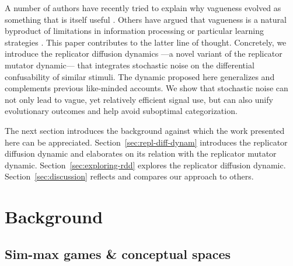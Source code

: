 \documentclass[fleqn,reqno,10pt]{article}
\begin{document}
A number of authors have recently tried to explain why vagueness
evolved as something that is itself useful
\citep[e.g.][]{Jaegherde-Jaegher2003:A-Game-Theoreti,Deemter2009:Utility-and-Lan,BlumeBoard2013:Intentional-Vag}.
Others have argued that vagueness is a natural byproduct of
limitations in information processing or particular learning
strategies
\citep[e.g.][]{FrankeJager2010:Vagueness-Signa,OConnor2013:The-Evolution-o}. This
paper contributes to the latter line of thought. Concretely, we
introduce the replicator diffusion dynamics ---a novel variant of the
replicator mutator dynamic--- that integrates stochastic noise on the
differential confusability of similar stimuli. The dynamic proposed
here generalizes and complements previous like-minded accounts. We
show that stochastic noise can not only lead to vague, yet relatively
efficient signal use, but can also unify evolutionary outcomes and
help avoid suboptimal categorization.

The next section introduces the background against which the work
presented here can be appreciated. Section~\ref{sec:repl-diff-dynam}
introduces the replicator diffusion dynamic and elaborates on its
relation with the replicator mutator
dynamic. Section~\ref{sec:exploring-rdd} explores the replicator
diffusion dynamic. Section~\ref{sec:discussion} reflects and compares
our approach to others.

\section{Background}
\label{sec:background}


\subsection{Sim-max games \& conceptual spaces}
\end{document}
